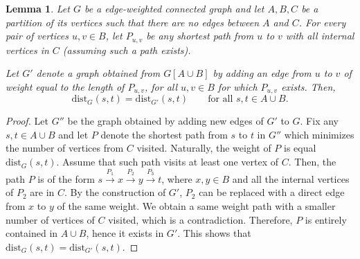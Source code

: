 \documentclass[11pt,a4paper]{article}
\newtheorem{lemma}{Lemma}[section]
\newcommand{\dist}{\mathrm{dist}}
\begin{document}
\begin{lemma}\label{l:inserting_paths}
Let $G$ be a edge-weighted connected graph and let $A, B, C$ be a partition of its vertices such that there are no edges between $A$ and $C$. For every pair of vertices $u, v \in B$, let $P_{u, v}$ be any shortest path from $u$ to $v$ with all internal vertices in $C$ (assuming such a path exists).

Let $G'$ denote a graph obtained from $G[A \cup B]$ by adding an edge from $u$ to $v$ of weight equal to the length of $P_{u, v}$, for all $u, v \in B$ for which $P_{u, v}$ exists. Then,  $$\dist_G(s, t) = \dist_{G'}(s, t)\qquad\textrm{for all }s,t\in A\cup B.$$
\end{lemma}
\begin{proof}
Let $G''$ be the graph obtained by adding new edges of $G'$ to $G$.
Fix any $s, t \in A \cup B$ and let $P$ denote the shortest path from $s$ to $t$ in $G''$ which minimizes the number of vertices from $C$ visited. Naturally, the weight of $P$ is equal $\dist_G(s, t)$. Assume that such path visits at least one vertex of $C$. Then, the path $P$ is of the form $s \xrightarrow{P_1} x \xrightarrow{P_2} y \xrightarrow{P_3} t$, where $x, y \in B$ and all the internal vertices of $P_2$ are in $C$. By the construction of $G'$, $P_2$ can be replaced with a direct edge from $x$ to $y$ of the same weight. We obtain a same weight path with a smaller number of vertices of $C$ visited, which is a contradiction. Therefore, $P$ is entirely contained in $A \cup B$, hence it exists in $G'$. This shows that $\dist_G(s, t) = \dist_{G'}(s, t)$.
\end{proof}
\end{document}
